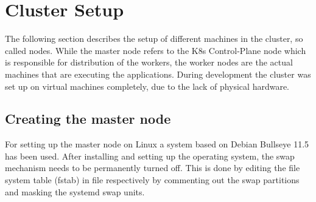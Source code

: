 




\section{Cluster Setup}
The following section describes the setup of different machines in the cluster, so called nodes. While the master node refers to the \ac{K8s} Control-Plane node which is responsible for distribution of the workers, the worker nodes are the actual machines that are executing the applications. During development the cluster was set up on virtual machines completely, due to the lack of physical hardware.


\subsection{Creating the master node}
For setting up the master node on Linux a system based on Debian Bullseye 11.5 has been used. After installing and setting up the operating system, the swap mechanism needs to be permanently turned off. This is done by editing the file system table (fstab) in file  respectively by commenting out the swap partitions and masking the systemd swap units.



%


